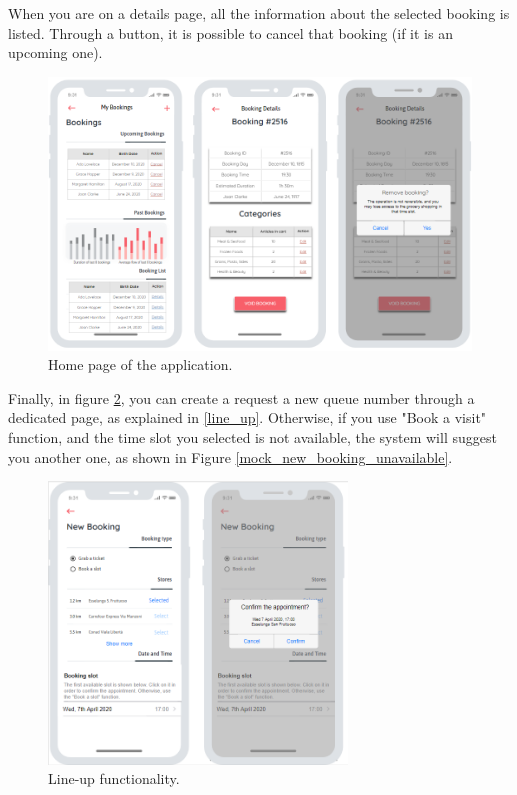 \documentclass[table, 12pt]{article}
\begin{document}
When you are on a details page, all the information about the selected booking is listed. Through a button, it is possible to cancel that booking (if it is an upcoming one).

\begin{figure}[H]
    \begin{center}
        \includegraphics[width=\textwidth]{assets/mock_bookings.png}
        \caption{Home page of the application.}
        \label{mock_bookings}
    \end{center}
\end{figure}

Finally, in figure \ref{mock_new_booking}, you can create a request a new queue number through a dedicated page, as explained in \ref{line_up}.
Otherwise, if you use "Book a visit" function, and the time slot you selected is not available, the system will suggest you another one, as shown in Figure \ref{mock_new_booking_unavailable}.

\begin{figure}[H]
    \begin{center}
        \includegraphics[width=225pt]{assets/mock_line_up.png}
        \caption{Line-up functionality.}
        \label{mock_new_booking}
    \end{center}
\end{figure}
\end{document}
